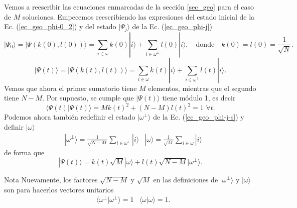 \documentclass[a4paper,11pt]{book} %
\numberwithin{equation}{chapter}
\begin{document}
Vemos a reescribir las ecuaciones enmarcadas de la sección \ref{sec_geo} para el caso de $M$ soluciones. Empecemos reescribiendo las expresiones del estado inicial de la Ec. (\ref{ec_geo_phi-0_2}) y del estado $|\Psi_j \rangle $ de la Ec. (\ref{ec_geo_phi-j}) 
\begin{equation} \label{ec_t-sols_phi-0}
\boxed{|\Psi_0 \rangle = | \Psi (k(0),l(0)) \rangle = \sum_{i \in \omega} k(0) |i \rangle + \sum_{i  \in \omega^{\perp}}  l(0)  |i \rangle}, \quad \text{donde} \quad \boxed{k(0) = l(0) = \frac{1}{\sqrt{N}}}.
\end{equation}
\begin{equation} \label{ec_t-sols_phi-j}
\boxed{|\Psi(t) \rangle = | \Psi (k(t),l(t)) \rangle = \sum_{i \in \omega} k(t) |i \rangle + \sum_{i  \in \omega^{\perp}} l(t) |i \rangle }.
\end{equation}
Vemos que ahora el primer sumatorio tiene $M$ elementos, mientras que el segundo tiene $N-M$. Por supuesto, se cumple que $|\Psi(t) \rangle$ tiene módulo 1, es decir
\begin{equation} \label{ec_t-sols_mod_1}
\langle \Psi(t) |\Psi(t) \rangle = \boxed{ M k(t)^2 + (N-M) l(t)^2 = 1 \, \, \forall t}.
\end{equation}
Podemos ahora también redefinir el estado $|\omega^{\perp} \rangle$ de la Ec. (\ref{ec_geo_phi-j-s}) y definir $| \omega \rangle$
\begin{equation}  \label{ec_t-sols_omega_omega-perp}
\begin{aligned}
& \boxed{| \omega^{\perp}  \rangle = \frac{1}{\sqrt{N-M}}\sum_{i \in \omega^{\perp}}  |i \rangle}
& \boxed{| \omega  \rangle = \frac{1}{\sqrt{M}}\sum_{i \in \omega} | i \rangle}
\end{aligned}
\end{equation}
de forma que
\begin{equation} \label{ec_t-sols_phi-j-s}
\boxed{|\Psi(t) \rangle =  k(t) \sqrt{M} |\omega \rangle + l(t) \sqrt{N-M} | \omega^{\perp}  \rangle}.
\end{equation}

	\begin{mybox_blue}{Nota}
	Nuevamente, los factores $\sqrt{N-M}$ y $\sqrt{M}$ en las definiciones de $| \omega^{\perp} \rangle$ y $| \omega \rangle$ son para hacerlos vectores unitarios
	\begin{equation} 
\begin{aligned}
	& \langle \omega^{\perp} | \omega^{\perp} \rangle = 1 
	& \langle \omega | \omega \rangle = 1 .
	\end{aligned}
\end{equation}
	\end{mybox_blue}
\end{document}
